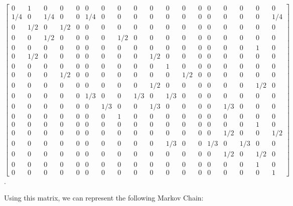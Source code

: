\documentclass{article}
\begin{document}
\setcounter{MaxMatrixCols}{20}
$$\begin{bmatrix}
0 & 1 & 0 & 0 & 0 & 0 & 0 & 0 & 0 & 0 & 0 & 0 & 0 & 0 & 0 & 0 & 0 & 0\\
1/4 & 0 & 1/4 & 0 & 0 & 1/4 & 0 & 0 & 0 & 0 & 0 & 0 & 0 & 0 & 0 & 0 & 0 & 1/4\\
0 & 1/2 & 0 & 1/2 & 0 & 0 & 0 & 0 & 0 & 0 & 0 & 0 & 0 & 0 & 0 & 0 & 0 & 0\\
0 & 0 & 1/2 & 0 & 0 & 0 & 0 & 1/2 & 0 & 0 & 0 & 0 & 0 & 0 & 0 & 0 & 0 & 0\\
0 & 0 & 0 & 0 & 0 & 0 & 0 & 0 & 0 & 0 & 0 & 0 & 0 & 0 & 0 & 0 & 1 & 0\\
0 & 1/2 & 0 & 0 & 0 & 0 & 0 & 0 & 0 & 1/2 & 0 & 0 & 0 & 0 & 0 & 0 & 0 & 0\\
0 & 0 & 0 & 0 & 0 & 0 & 0 & 0 & 0 & 0 & 1 & 0 & 0 & 0 & 0 & 0 & 0 & 0\\
0 & 0 & 0 & 1/2 & 0 & 0 & 0 & 0 & 0 & 0 & 0 & 1/2 & 0 & 0 & 0 & 0 & 0 & 0\\
0 & 0 & 0 & 0 & 0 & 0 & 0 & 0 & 0 & 1/2 & 0 & 0 & 0 & 0 & 0 & 0 & 1/2 & 0\\
0 & 0 & 0 & 0 & 0 & 1/3 & 0 & 0 & 1/3 & 0 & 1/3 & 0 & 0 & 0 & 0 & 0 & 0 & 0\\
0 & 0 & 0 & 0 & 0 & 0 & 1/3 & 0 & 0 & 1/3 & 0 & 0 & 0 & 0 & 1/3 & 0 & 0 & 0\\
0 & 0 & 0 & 0 & 0 & 0 & 0 & 1 & 0 & 0 & 0 & 0 & 0 & 0 & 0 & 0 & 0 & 0\\
0 & 0 & 0 & 0 & 0 & 0 & 0 & 0 & 0 & 0 & 0 & 0 & 0 & 0 & 0 & 0 & 1 & 0\\
0 & 0 & 0 & 0 & 0 & 0 & 0 & 0 & 0 & 0 & 0 & 0 & 0 & 0 & 1/2 & 0 & 0 & 1/2\\
0 & 0 & 0 & 0 & 0 & 0 & 0 & 0 & 0 & 0 & 1/3 & 0 & 0 & 1/3 & 0 & 1/3 & 0 & 0\\
0 & 0 & 0 & 0 & 0 & 0 & 0 & 0 & 0 & 0 & 0 & 0 & 0 & 0 & 1/2 & 0 & 1/2 & 0\\
0 & 0 & 0 & 0 & 0 & 0 & 0 & 0 & 0 & 0 & 0 & 0 & 0 & 0 & 0 & 0 & 1 & 0\\
0 & 0 & 0 & 0 & 0 & 0 & 0 & 0 & 0 & 0 & 0 & 0 & 0 & 0 & 0 & 0 & 0 & 1
\end{bmatrix}$$.

Using this matrix, we can represent the following Markov Chain:
\end{document}
